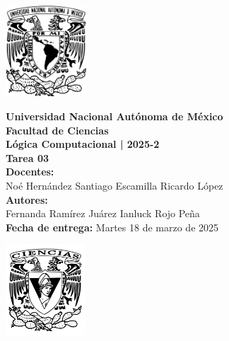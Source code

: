 \documentclass[12pt,letterpaper]{article}
\begin{document}
\begin{center}
  \begin{minipage}{3cm}
    \begin{center}
      \includegraphics[height=3.4cm]{../unam_logo.png}
    \end{center}
  \end{minipage}\hfill
  \begin{minipage}{10cm}
    \begin{center}
      \textbf{\Large Universidad Nacional Autónoma de México}\\[0.2cm]
      \textbf{\large Facultad de Ciencias}\\[0.2cm]
      \textbf{Lógica Computacional | 2025-2}\\[0.4cm]
      \textbf{\Large Tarea 03}\\[0.1cm]
      \textbf{Docentes:}\\
      Noé Hernández \hspace{1em} Santiago Escamilla \hspace{1em} Ricardo López\\[0.3cm]
      \textbf{Autores:}\\
      Fernanda Ramírez Juárez \quad Ianluck Rojo Peña\\[0.3cm]
      \textbf{Fecha de entrega:} Martes 18 de marzo de 2025
    \end{center}
  \end{minipage}\hfill
  \begin{minipage}{3cm}
    \begin{center}
      \includegraphics[height=3.4cm]{../fc_logo.png}
    \end{center}
  \end{minipage}
\end{center}
\end{document}
